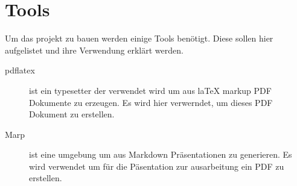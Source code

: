 \chapter{Tools}

Um das projekt zu bauen werden einige Tools benötigt. Diese sollen hier aufgelistet und ihre Verwendung erklärt werden.

\begin{description}
    \item[pdflatex] ist ein typesetter der verwendet wird um aus laTeX markup PDF Dokumente zu erzeugen. Es wird hier verwerndet, um dieses PDF Dokument zu erstellen.
    \item[Marp] ist eine  umgebung um aus Markdown Präsentationen zu generieren. Es wird verwendet um für die Päsentation zur ausarbeitung ein PDF zu erstellen.
\end{description}
